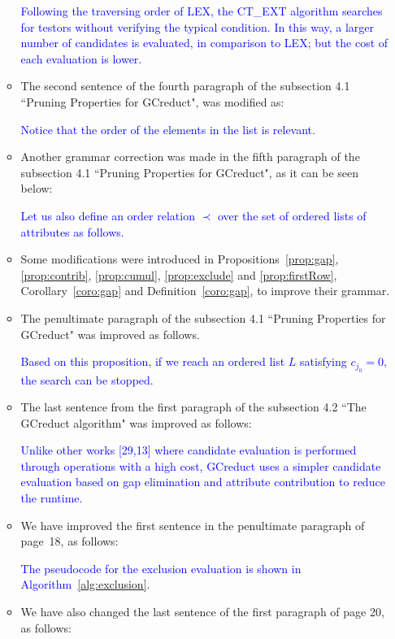 \documentclass{letter}
\begin{document}
\begin{letter}{}
\begin{enumerate}
\begin{itemize}
		\textcolor{blue}{Following the traversing order of LEX, the CT\_EXT algorithm searches for testors without verifying the typical condition. In this way, a larger number of candidates is evaluated, in comparison to LEX; but the cost of each evaluation is lower.}
		
		\item The second sentence of the fourth paragraph of the subsection 4.1 ``Pruning Properties for GCreduct", was modified as:
		
		\textcolor{blue}{Notice that the order of the elements in the list is relevant.}
		 
		\item Another grammar correction was made in the fifth paragraph of the subsection 4.1 ``Pruning Properties for GCreduct", as it can be seen below:
		
		\textcolor{blue}{Let us also define an order relation $\prec$ over the set of ordered lists of attributes as follows.}
		
		\item Some modifications were introduced in Propositions~\ref{prop:gap}, \ref{prop:contrib}, \ref{prop:cumul}, \ref{prop:exclude} and \ref{prop:firstRow}, Corollary~\ref{coro:gap} and Definition~\ref{coro:gap}, to improve their grammar.  
		
		\item The penultimate paragraph of the subsection 4.1 ``Pruning Properties for GCreduct" was improved as follows.
		
		\textcolor{blue}{Based on this proposition, if we reach an ordered list $L$ satisfying $c_{j_0}=0$, the search can be stopped.}
		
		\item The last sentence from the first paragraph of the subsection 4.2 ``The GCreduct algorithm" was improved as follows:
		
	    \textcolor{blue}{Unlike other works [29,13] where candidate evaluation is performed through operations with a high cost, GCreduct uses a simpler candidate evaluation based on gap elimination and attribute contribution to reduce the runtime.}
		
		\item We have improved the first sentence in the penultimate paragraph of page~18, as follows:
		
		\textcolor{blue}{The pseudocode for the exclusion evaluation is shown in Algorithm~\ref{alg:exclusion}.}
		
		\item We have also changed the last sentence of the first paragraph of page 20, as follows:
		

\end{itemize}
\end{enumerate}
\end{letter}
\end{document}
